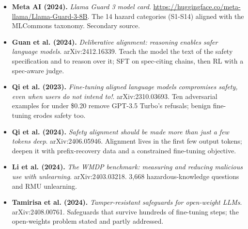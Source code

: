 \documentclass[11pt,letterpaper]{article}
\begin{document}
\begin{itemize}[leftmargin=1.2em,itemsep=3pt]
\item \textbf{Meta AI (2024).} \textit{Llama Guard 3 model card}. \url{https://huggingface.co/meta-llama/Llama-Guard-3-8B}. The 14 hazard categories (S1-S14) aligned with the MLCommons taxonomy. Secondary source.
\item \textbf{Guan et al. (2024).} \textit{Deliberative alignment: reasoning enables safer language models}. arXiv:2412.16339. Teach the model the text of the safety specification and to reason over it; SFT on spec-citing chains, then RL with a spec-aware judge.
\item \textbf{Qi et al. (2023).} \textit{Fine-tuning aligned language models compromises safety, even when users do not intend to!}. arXiv:2310.03693. Ten adversarial examples for under \$0.20 remove GPT-3.5 Turbo's refusals; benign fine-tuning erodes safety too.
\item \textbf{Qi et al. (2024).} \textit{Safety alignment should be made more than just a few tokens deep}. arXiv:2406.05946. Alignment lives in the first few output tokens; deepen it with prefix-recovery data and a constrained fine-tuning objective.
\item \textbf{Li et al. (2024).} \textit{The WMDP benchmark: measuring and reducing malicious use with unlearning}. arXiv:2403.03218. 3,668 hazardous-knowledge questions and RMU unlearning.
\item \textbf{Tamirisa et al. (2024).} \textit{Tamper-resistant safeguards for open-weight LLMs}. arXiv:2408.00761. Safeguards that survive hundreds of fine-tuning steps; the open-weights problem stated and partly addressed.
\end{itemize}
\end{document}
